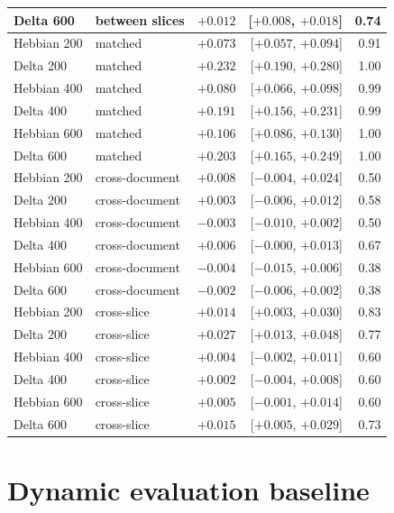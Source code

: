 \documentclass[12pt,a4paper]{report}
\begin{document}
\begin{table}[H]
\begin{tabular}{llrrr}
    Delta 600 & between slices & $+0.012$ & [$+0.008$, $+0.018$] & 0.74 \\
    \midrule
    Hebbian 200 & matched & $+0.073$ & [$+0.057$, $+0.094$] & 0.91 \\
    Delta 200 & matched & $+0.232$ & [$+0.190$, $+0.280$] & 1.00 \\
    Hebbian 400 & matched & $+0.080$ & [$+0.066$, $+0.098$] & 0.99 \\
    Delta 400 & matched & $+0.191$ & [$+0.156$, $+0.231$] & 0.99 \\
    Hebbian 600 & matched & $+0.106$ & [$+0.086$, $+0.130$] & 1.00 \\
    Delta 600 & matched & $+0.203$ & [$+0.165$, $+0.249$] & 1.00 \\
    \midrule
    Hebbian 200 & cross-document & $+0.008$ & [$-0.004$, $+0.024$] & 0.50 \\
    Delta 200 & cross-document & $+0.003$ & [$-0.006$, $+0.012$] & 0.58 \\
    Hebbian 400 & cross-document & $-0.003$ & [$-0.010$, $+0.002$] & 0.50 \\
    Delta 400 & cross-document & $+0.006$ & [$-0.000$, $+0.013$] & 0.67 \\
    Hebbian 600 & cross-document & $-0.004$ & [$-0.015$, $+0.006$] & 0.38 \\
    Delta 600 & cross-document & $-0.002$ & [$-0.006$, $+0.002$] & 0.38 \\
    \midrule
    Hebbian 200 & cross-slice & $+0.014$ & [$+0.003$, $+0.030$] & 0.83 \\
    Delta 200 & cross-slice & $+0.027$ & [$+0.013$, $+0.048$] & 0.77 \\
    Hebbian 400 & cross-slice & $+0.004$ & [$-0.002$, $+0.011$] & 0.60 \\
    Delta 400 & cross-slice & $+0.002$ & [$-0.004$, $+0.008$] & 0.60 \\
    Hebbian 600 & cross-slice & $+0.005$ & [$-0.001$, $+0.014$] & 0.60 \\
    Delta 600 & cross-slice & $+0.015$ & [$+0.005$, $+0.029$] & 0.73 \\
    \bottomrule
  \end{tabular}
\end{table}

\section{Dynamic evaluation baseline}
\label{app-dyneval}
\end{document}
